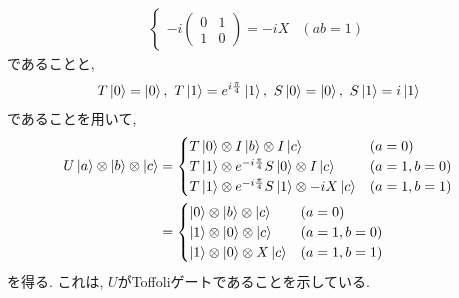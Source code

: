 \begin{ex}
\begin{align*}
\begin{cases}
            -i
            \begin{pmatrix}
                0 & 1 \\
                1 & 0
            \end{pmatrix}
            =-i X & (ab = 1)
        \end{cases}
    \end{align*}
    であることと,
    \begin{align*}
        T\ket{0} = \ket{0} , \ T\ket{1} = e^{ i \frac{\pi}{4}}\ket{1} ,\
        S\ket{0} = \ket{0} , \ S\ket{1} = i\ket{1}
    \end{align*}
    であることを用いて,
    \begin{align*}
        U \ket{a} \otimes \ket{b} \otimes \ket{c}
         & =
        \begin{cases}
            T \ket{0} \otimes I \ket{b} \otimes  I \ket{c}                       & (a=0)     \\
            T \ket{1} \otimes e^{-i \frac{\pi}{4}} S \ket{0} \otimes I \ket{c}   & (a=1,b=0) \\
            T \ket{1} \otimes e^{-i \frac{\pi}{4}} S \ket{1} \otimes -iX \ket{c} & (a=1,b=1)
        \end{cases}
        \\
         & =
        \begin{cases}
            \ket{0} \otimes \ket{b} \otimes \ket{c}   & (a=0)     \\
            \ket{1} \otimes  \ket{0} \otimes \ket{c}  & (a=1,b=0) \\
            \ket{1} \otimes \ket{0} \otimes X \ket{c} & (a=1,b=1)
        \end{cases}
    \end{align*}
    を得る. これは, $U$がToffoliゲートであることを示している.
\end{ex}


